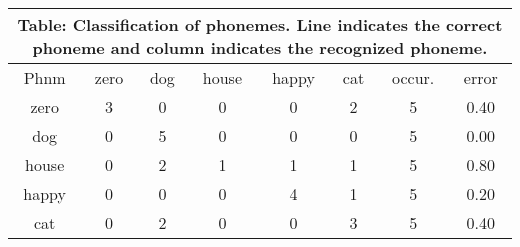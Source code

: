 \documentclass[10pt]{article}
\begin{document}
\tiny
\begin{tabular}{|@{}c@{}||@{}c@{}|@{}c@{}|@{}c@{}|@{}c@{}|@{}c@{}|@{}c@{}|@{}c@{}|}
\hline
\multicolumn{8}{c}{Table: Classification of phonemes. Line indicates the correct phoneme and column indicates the recognized phoneme.} \\ \hline \hline
Phnm & zero & dog & house & happy & cat & occur. & error \\ \hline
zero & 3 & 0 & 0 & 0 & 2 & 5 & 0.40 \\ \hline
dog & 0 & 5 & 0 & 0 & 0 & 5 & 0.00 \\ \hline
house & 0 & 2 & 1 & 1 & 1 & 5 & 0.80 \\ \hline
happy & 0 & 0 & 0 & 4 & 1 & 5 & 0.20 \\ \hline
cat & 0 & 2 & 0 & 0 & 3 & 5 & 0.40 \\ \hline
\end{tabular}
\end{document}
